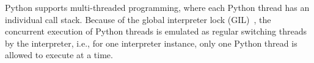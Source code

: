 \sloppy
Python supports multi-threaded programming, where each Python thread has an individual call stack. Because of the global interpreter lock (GIL)~\cite{gil}, the concurrent execution of Python threads is emulated as regular switching threads by the interpreter, i.e., for one interpreter instance, only one Python thread is allowed to execute at a time.



        
    
